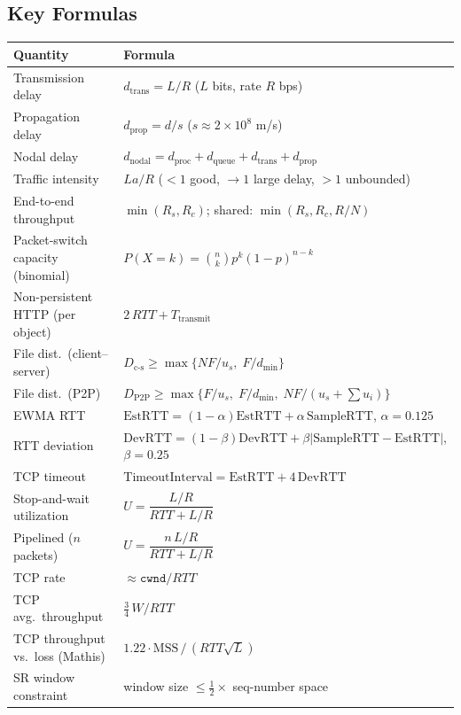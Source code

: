 \documentclass[hidelinks]{article}
\begin{document}
\subsection{Key Formulas}

\renewcommand{\arraystretch}{1.45}
\noindent\begin{tabularx}{\textwidth}{|l|X|}
\hline
\textbf{Quantity} & \textbf{Formula} \\
\hline
Transmission delay & $d_{\text{trans}} = L/R$ \quad ($L$ bits, rate $R$ bps) \\
\hline
Propagation delay & $d_{\text{prop}} = d/s$ \quad ($s \approx 2\times 10^{8}$ m/s) \\
\hline
Nodal delay & $d_{\text{nodal}} = d_{\text{proc}} + d_{\text{queue}} + d_{\text{trans}} + d_{\text{prop}}$ \\
\hline
Traffic intensity & $La/R$ \; ($<1$ good, $\to 1$ large delay, $>1$ unbounded) \\
\hline
End-to-end throughput & $\min(R_s, R_c)$; shared: $\min(R_s, R_c, R/N)$ \\
\hline
Packet-switch capacity (binomial) & $P(X{=}k)=\binom{n}{k}p^{k}(1-p)^{n-k}$ \\
\hline
Non-persistent HTTP (per object) & $2\,RTT + T_{\text{transmit}}$ \\
\hline
File dist.\ (client--server) & $D_{\text{c-s}} \geq \max\{NF/u_s,\; F/d_{\min}\}$ \\
\hline
File dist.\ (P2P) & $D_{\text{P2P}} \geq \max\{F/u_s,\; F/d_{\min},\; NF/(u_s{+}\textstyle\sum u_i)\}$ \\
\hline
EWMA RTT & $\text{EstRTT}=(1{-}\alpha)\text{EstRTT}+\alpha\,\text{SampleRTT}$, $\alpha{=}0.125$ \\
\hline
RTT deviation & $\text{DevRTT}=(1{-}\beta)\text{DevRTT}+\beta|\text{SampleRTT}-\text{EstRTT}|$, $\beta{=}0.25$ \\
\hline
TCP timeout & $\text{TimeoutInterval}=\text{EstRTT}+4\,\text{DevRTT}$ \\
\hline
Stop-and-wait utilization & $U = \dfrac{L/R}{RTT + L/R}$ \\
\hline
Pipelined ($n$ packets) & $U = \dfrac{n\,L/R}{RTT + L/R}$ \\
\hline
TCP rate & $\approx \texttt{cwnd}/RTT$ \\
\hline
TCP avg.\ throughput & $\tfrac{3}{4}\,W/RTT$ \\
\hline
TCP throughput vs.\ loss (Mathis) & $1.22\cdot\text{MSS}\,/\,(RTT\sqrt{L})$ \\
\hline
SR window constraint & window size $\leq \tfrac{1}{2}\times$ seq-number space \\

\end{tabularx}
\end{document}
